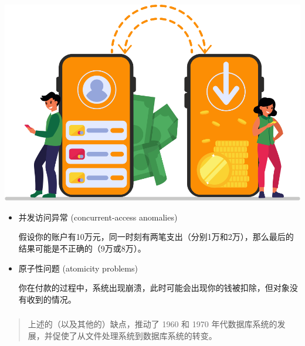 \documentclass[aspectratio=169, 14pt]{beamer}
\begin{document}
\begin{frame}
    \begin{center}
        \includegraphics[height=.4\paperheight]{image/money}
    \end{center}
    \begin{itemize}
        \item \alert{并发访问异常
        } (concurrent-access anomalies)

        假设你的账户有10万元，同一时刻有两笔支出（分别1万和2万），那么最后的结果可能是不正确的（9万或8万）。
        \item \alert{原子性问题} (atomicity problems)
        
        你在付款的过程中，系统出现崩溃，此时可能会出现你的钱被扣除，但对象没有收到的情况。
    \end{itemize}

\end{frame}

\begin{frame}
    \frametitle{}

    \begin{quote}
        上述的（以及其他的）缺点，推动了 1960 和 1970 年代数据库系统的发展，并促使了从\alert{文件处理系统}到\alert{数据库系统}的转变。
    \end{quote}

    \begin{center}
        {\Huge {}  }
    \end{center}

\end{frame}
\end{document}
